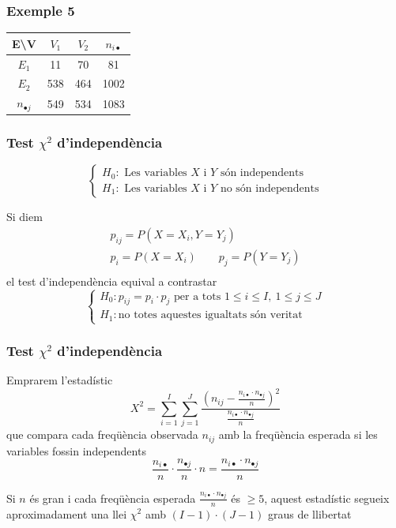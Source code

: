 \documentclass[12pt,t]{beamer}
\renewcommand{\emph}[1]{{\color{red}#1}}
\renewcommand{\leq}{\leqslant}
\renewcommand{\geq}{\geqslant}
\theoremstyle{plain}
\theoremstyle{definition}
\begin{document}
\begin{frame}
\frametitle{Exemple 5}

\begin{center}
 \begin{tabular}{|c|cc|c|}
 \hline
E\textbackslash V& $V_1$ & $V_2$ & $n_{i\bullet}$\\\hline
$E_1$ &11& 70  & 81\\
$E_2$ & 538 &464& 1002 \\\hline
$n_{\bullet j} $& 549 & 534 & 1083\\
\hline
 \end{tabular}
\end{center}

\end{frame}



\begin{frame}
\frametitle{Test $\chi^2$ d'independència}
$$
\left\{
\begin{array}{ll}
H_0: \mbox{ Les variables  $X$  i  $Y$  són independents}\\
H_1: \mbox{ Les variables  $X$  i  $Y$  no són independents}
\end{array}
\right.
$$

Si diem 
$$
\begin{array}{c}
p_{ij}=P(X=X_i, Y=Y_j)\\
p_i=P(X=X_i)\qquad
p_{j}=P(Y=Y_j)\\
\end{array}
$$
 el test d'independència equival a contrastar
$$
\left\{
\begin{array}{ll}
H_0: p_{ij}=p_i \cdot p_j \mbox{ per a tots } 1\leq i \leq I,\ 1\leq j\leq J \\
H_1: \mbox{no totes aquestes igualtats són veritat}
\end{array}
\right.
$$
\end{frame}


\begin{frame}
\frametitle{Test $\chi^2$ d'independència}
Emprarem l'estadístic 
$$
X^2=\sum\limits_{i=1}^I\sum\limits_{j=1}^J \frac{ \left( n_{ij}- \frac{n_{i\bullet}\cdot n_{\bullet j} }{n}\right)^2 } {\frac{n_{i\bullet} \cdot n_{\bullet j}}{n}}
$$
que compara cada \emph{freqüència observada} $n_{ij}$ amb la \emph{freqüència esperada}  si les variables fossin independents
$$
\dfrac{n_{i\bullet}}{n}\cdot \dfrac{n_{\bullet j}}{n}\cdot n=\dfrac{n_{i\bullet}\cdot n_{\bullet j}}{n}
$$ 

\medskip

Si $n$ és gran i cada freqüència esperada $\frac{n_{i\bullet}\cdot n_{\bullet j}}{n}$ és $\geq 5$, 
aquest estadístic segueix aproximadament una llei $\chi^2$ amb
$(I-1) \cdot (J -1)$ graus de llibertat
\end{frame}
\end{document}
